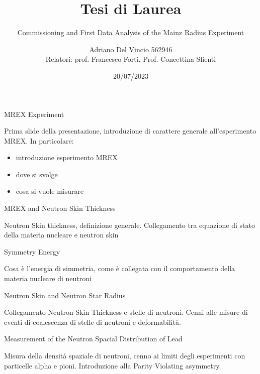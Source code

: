 \documentclass[9pt,a4paper]{beamer}
\author[Adriano Del Vincio]{Adriano Del Vincio 562946\\ \footnotesize Relatori: prof. Francesco Forti, Prof. Concettina Sfienti}
\institute[Università di Pisa]{\textbf {Università di Pisa}}
\title{Tesi di Laurea}
\subtitle{Commissioning and First Data Analysis of the Mainz Radius Experiment}
\date{20/07/2023}
\begin{document}
\frame{\titlepage}

\begin{frame}{MREX Experiment}

Prima slide della presentazione, introduzione di carattere generale all'esperimento MREX. In particolare:

\begin{itemize}
\item introduzione esperimento MREX
\item dove si svolge
\item cosa si vuole misurare
\end{itemize}
\end{frame}


\begin{frame}{MREX and Neutron Skin Thickness}

Neutron Skin thickness, definizione generale. Collegamento tra equazione di stato della materia nucleare e neutron skin

\end{frame}

\begin{frame}{Symmetry Energy}

Cosa è l'energia di simmetria, come è collegata con il comportamento della materia nucleare di neutroni 

\end{frame}

\begin{frame}{Neutron Skin and Neutron Star Radius}

Collegamento Neutron Skin Thickness e stelle di neutroni. Cenni alle misure di eventi di coalescenza di stelle di neutroni e deformabilità.

\end{frame}

\begin{frame}{Measurement of the Neutron Spacial Distribution of Lead}

Misura della densità spaziale di neutroni, cenno ai limiti degli esperimenti con particelle alpha e pioni. Introduzione alla Parity Violating asymmetry.

\end{frame}
\end{document}
